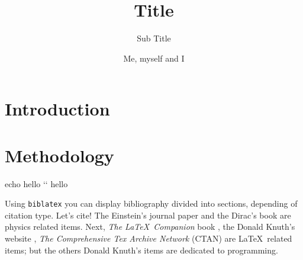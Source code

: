 \documentclass[
   fontsize=10.5pt,
   invert-title=true,
   titlepage=false,
   titleimage-ratio=13,
   class=article,
   twocolumn,
   parskip=half-
]{bfhpub}				%
\begin{document}
  \title{Title}
  \subtitle{Sub Title}
  \author{Me, myself and I}
  \subject{BTF3232}
  

\makeatletter
\twocolumn[
   \begin{@twocolumnfalse} 
     \maketitle 
     \textbf{\blindtext[1]}
    \end{@twocolumnfalse}
    \vskip1.5em
]
\makeatother




\section{Introduction}
\blindtext[1]

\section{Methodology}

\begin{ubuntu}
echo hello `\StartConsole`
hello
\end{ubuntu}

Using \texttt{biblatex} you can display bibliography divided into sections, depending of citation type. 
Let's cite! The Einstein's journal paper \cite{einstein} and the Dirac's book \cite{dirac} are physics related items. 
Next, \textit{The \LaTeX\ Companion} book \cite{latexcompanion}, the Donald Knuth's website \cite{knuthwebsite}, \textit{The Comprehensive Tex Archive Network} (CTAN) \cite{ctan} are \LaTeX\ related items; but the others Donald Knuth's items \cite{knuth-fa,knuth-acp} are dedicated to programming.
\end{document}
